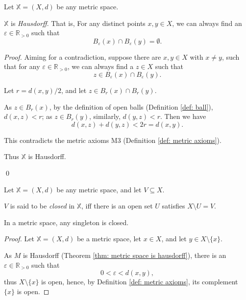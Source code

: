 \begin{theorem}
	\label{thm: metric space is hausdorff}
	Let $\mathbb X = (X, d)$ be any metric space.
	
	$\mathbb X$ is \textit{Hausdorff}. That is, For any distinct points $x,y \in X$, we can always find an $\varepsilon \in \mathbb R_{> 0}$ such that
	$$
	B_\varepsilon(x) \cap B_\varepsilon(y) = \emptyset.
	$$
	
	\begin{proof}
		Aiming for a contradiction, suppose there are $x,y \in X$ with $x \ne y$, such that for any $\varepsilon \in \mathbb R_{> 0}$, we can always find a $z \in X$ such that
		$$
		z \in B_\varepsilon(x) \cap B_\varepsilon(y).
		$$
		
		Let $r = d(x,y)/2$, and let $z \in B_r(x) \cap B_r(y)$.
		
		As $z \in B_r(x)$, by the definition of open balls (Definition \ref{def: ball}), $d(x,z) < r$; as $z \in B_r(y)$, similarly, $d(y,z)< r$. Then we have
		$$
		d(x, z) + d(y, z) < 2r = d(x,y).
		$$
		
		This contradicts the metric axioms M3 (Definition \ref{def: metric axioms}).
		
		Thus $\mathbb X$ is Hausdorff.
		
		\qed
	\end{proof}
\end{theorem}


\begin{definition}
	\label{def: closed set in metric space}
	Let $\mathbb X = (X, d)$ be any metric space, and let $V \subseteq X$.
	
	$V$ is said to be \textit{closed} in $\mathbb X$, iff there is an open set $U$ satisfies $X \setminus U = V$.
\end{definition}


\begin{lemma}
	\label{lm: singleton in metric space is closed}
	In a metric space, any singleton is closed.
	
	\begin{proof}
		Let $\mathbb X =(X, d)$ be a metric space, let $x \in X$, and let $y \in X \setminus \{x\}$.
		
		As $M$ is Hausdorff (Theorem \ref{thm: metric space is hausdorff}), there is an $\varepsilon \in \mathbb R_{> 0}$ such that
		$$
		0 < \varepsilon < d(x,y),
		$$
		thus $X \setminus \{x\}$ is open, hence, by Definition \ref{def: metric axioms}, its complement $\{x\}$ is open.
		
		\qedlm
	\end{proof}
\end{lemma}


